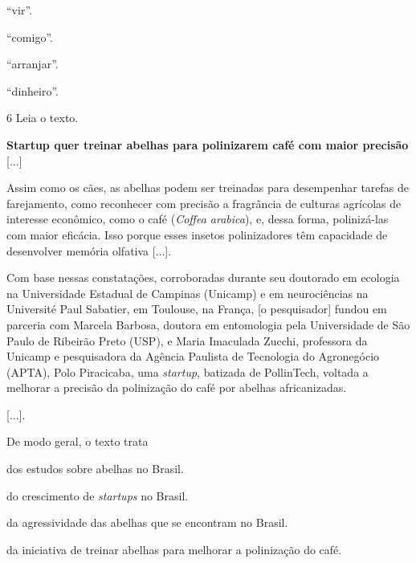 \begin{escolha}
\item “vir”.

\item “comigo”.

\item “arranjar”.

\item “dinheiro”.
\end{escolha}


\pagebreak
\num{6} Leia o texto.

\begin{myquote}
\textbf{Startup quer treinar abelhas para polinizarem café com maior precisão}\\

{[}...{]}

Assim como os cães, as abelhas podem ser treinadas para desempenhar
tarefas de farejamento, como reconhecer com precisão a fragrância de
culturas agrícolas de interesse econômico, como o café (\textit{Coffea arabica}),
e, dessa forma, polinizá-las com maior eficácia. Isso porque esses
insetos polinizadores têm capacidade de desenvolver memória olfativa
{[}...{]}.

Com base nessas constatações, corroboradas durante seu doutorado em
ecologia na Universidade Estadual de Campinas (Unicamp) e em
neurociências na Université Paul Sabatier, em Toulouse, na França,
[o pesquisador] fundou em parceria com Marcela Barbosa, doutora em entomologia
pela Universidade de São Paulo de Ribeirão Preto (USP), e Maria
Imaculada Zucchi, professora da Unicamp e pesquisadora da Agência
Paulista de Tecnologia do Agronegócio (APTA), Polo Piracicaba, uma
\textit{startup}, batizada de PollinTech, voltada a melhorar a precisão da
polinização do café por abelhas africanizadas.

{[}...{]}.

\end{myquote}

De modo geral, o texto trata

\begin{escolha}
\item dos estudos sobre abelhas no Brasil.

\item do crescimento de \textit{startups} no Brasil.

\item da agressividade das abelhas que se encontram no Brasil.

\item da iniciativa de treinar abelhas para melhorar a polinização do café.
\end{escolha}


